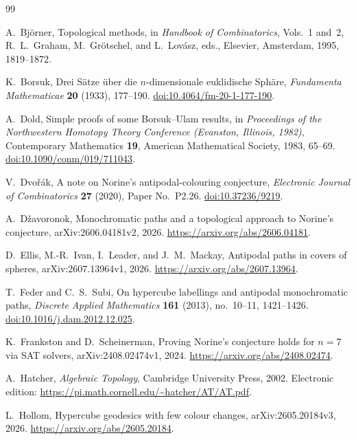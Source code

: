 \documentclass[reqno,12pt]{amsart}
\theoremstyle{definition}
\begin{document}
\begin{thebibliography}{99}

A.~Bj\"orner,
Topological methods,
in \emph{Handbook of Combinatorics}, Vols.~1 and~2,
R.~L.~Graham, M.~Gr\"otschel, and L.~Lov\'asz, eds.,
Elsevier, Amsterdam, 1995, 1819--1872.

K.~Borsuk,
Drei S\"atze \"uber die \(n\)-dimensionale euklidische Sph\"are,
\emph{Fundamenta Mathematicae} \textbf{20} (1933), 177--190.
\href{https://doi.org/10.4064/fm-20-1-177-190}
{doi:10.4064/fm-20-1-177-190}.

A.~Dold,
Simple proofs of some Borsuk--Ulam results,
in \emph{Proceedings of the Northwestern Homotopy Theory Conference
(Evanston, Illinois, 1982)},
Contemporary Mathematics \textbf{19},
American Mathematical Society, 1983, 65--69.
\href{https://doi.org/10.1090/conm/019/711043}
{doi:10.1090/conm/019/711043}.

V.~Dvo\v{r}\'ak,
A note on Norine's antipodal-colouring conjecture,
\emph{Electronic Journal of Combinatorics} \textbf{27} (2020),
Paper No.~P2.26.
\href{https://doi.org/10.37236/9219}{doi:10.37236/9219}.

A.~D\v{z}avoronok,
Monochromatic paths and a topological approach to Norine's conjecture,
arXiv:2606.04181v2, 2026.
\url{https://arxiv.org/abs/2606.04181}.

D.~Ellis, M.-R.~Ivan, I.~Leader, and J.~M.~Mackay,
Antipodal paths in covers of spheres,
arXiv:2607.13964v1, 2026.
\url{https://arxiv.org/abs/2607.13964}.

T.~Feder and C.~S.~Subi,
On hypercube labellings and antipodal monochromatic paths,
\emph{Discrete Applied Mathematics} \textbf{161} (2013),
no.~10--11, 1421--1426.
\href{https://doi.org/10.1016/j.dam.2012.12.025}
{doi:10.1016/j.dam.2012.12.025}.

K.~Frankston and D.~Scheinerman,
Proving Norine's conjecture holds for \(n=7\) via SAT solvers,
arXiv:2408.02474v1, 2024.
\url{https://arxiv.org/abs/2408.02474}.

A.~Hatcher,
\emph{Algebraic Topology},
Cambridge University Press, 2002.
Electronic edition:
\url{https://pi.math.cornell.edu/~hatcher/AT/AT.pdf}.

L.~Hollom,
Hypercube geodesics with few colour changes,
arXiv:2605.20184v3, 2026.
\url{https://arxiv.org/abs/2605.20184}.


\end{thebibliography}
\end{document}
